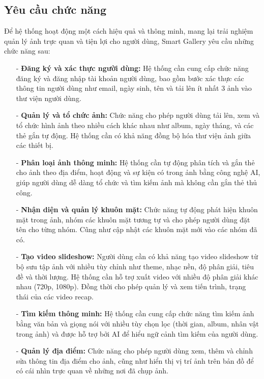 \subsection{Yêu cầu chức năng}

Để hệ thống hoạt động một cách hiệu quả và thông minh, mang lại trải nghiệm quản lý ảnh trực quan và tiện lợi cho người dùng, Smart Gallery yêu cầu những chức năng sau:

\begin{itemize}
    \item[-] \textbf{Đăng ký và xác thực người dùng:} Hệ thống cần cung cấp chức năng đăng ký và đăng nhập tài khoản người dùng, bao gồm bước xác thực các thông tin người dùng như email, ngày sinh, tên và tải lên ít nhất 3 ảnh vào thư viện người dùng. 
    
    \item[-] \textbf{Quản lý và tổ chức ảnh:} Chức năng cho phép người dùng tải lên, xem và tổ chức hình ảnh theo nhiều cách khác nhau như album, ngày tháng, và các thẻ gắn tự động. Hệ thống cần có khả năng đồng bộ hóa thư viện ảnh giữa các thiết bị.
    
    \item[-] \textbf{Phân loại ảnh thông minh:} Hệ thống cần tự động phân tích và gắn thẻ cho ảnh theo địa điểm, hoạt động và sự kiện có trong ảnh bằng công nghệ AI, giúp người dùng dễ dàng tổ chức và tìm kiếm ảnh mà không cần gắn thẻ thủ công.
    
    \item[-] \textbf{Nhận diện và quản lý khuôn mặt:} Chức năng tự động phát hiện khuôn mặt trong ảnh, nhóm các khuôn mặt tương tự và cho phép người dùng đặt tên cho từng nhóm. Cũng như cập nhật các khuôn mặt mới vào các nhóm đã có.
    
    \item[-] \textbf{Tạo video slideshow:} Người dùng cần có khả năng tạo video slideshow từ bộ sưu tập ảnh với nhiều tùy chỉnh như theme, nhạc nền, độ phân giải, tiêu đề và thời lượng. Hệ thống cần hỗ trợ xuất video với nhiều độ phân giải khác nhau (720p, 1080p). Đồng thời cho phép quản lý và xem tiến trình, trạng thái của các video recap.
    
    \item[-] \textbf{Tìm kiếm thông minh:} Hệ thống cần cung cấp chức năng tìm kiếm ảnh bằng văn bản và giọng nói với nhiều tùy chọn lọc (thời gian, album, nhân vật trong ảnh) và được hỗ trợ bởi AI để hiểu ngữ cảnh tìm kiếm của người dùng.
    
    \item[-] \textbf{Quản lý địa điểm:} Chức năng cho phép người dùng xem, thêm và chỉnh sửa thông tin địa điểm cho ảnh, cũng như hiển thị vị trí ảnh trên bản đồ để có cái nhìn trực quan về những nơi đã chụp ảnh.
\end{itemize}